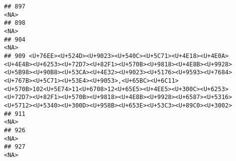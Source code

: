 \documentclass[
]{article}
\begin{document}
\begin{verbatim}
## 897                                                                                                                                                                                                                                                                                                                                                                                                                                     <NA>
## 898                                                                                                                                                                                                                                                                                                                                                                                                                                     <NA>
## 904                                                                                                                                                                                                                                                                                                                                                                                                                                     <NA>
## 909 <U+76EE><U+524D><U+9023><U+540C><U+5C71><U+4E18><U+4E0A><U+4E4B><U+6253><U+72D7><U+82F1><U+570B><U+9818><U+4E8B><U+9928><U+5B98><U+90B8><U+53CA><U+4E32><U+9023><U+5176><U+9593><U+7684><U+767B><U+5C71><U+53E4><U+9053>,<U+65BC><U+6C11><U+570B>102<U+5E74>11<U+6708>12<U+65E5><U+4EE5><U+300C><U+6253><U+72D7><U+82F1><U+570B><U+9818><U+4E8B><U+9928><U+6587><U+5316><U+5712><U+5340><U+300D><U+958B><U+653E><U+53C3><U+89C0><U+3002>
## 911                                                                                                                                                                                                                                                                                                                                                                                                                                     <NA>
## 926                                                                                                                                                                                                                                                                                                                                                                                                                                     <NA>
## 927                                                                                                                                                                                                                                                                                                                                                                                                                                     <NA>

\end{verbatim}
\end{document}
